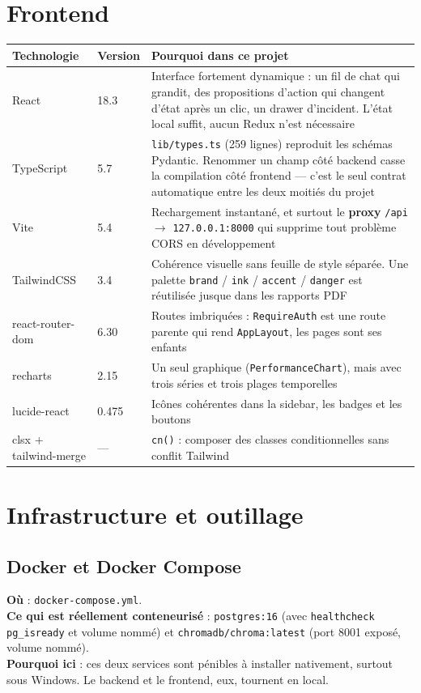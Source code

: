 \documentclass[11pt,a4paper]{report}
\newcommand{\file}[1]{\texttt{\small #1}}
\newcommand{\fn}[1]{\texttt{\small\textcolor{oasisviolet}{#1}}}
\newcommand{\cls}[1]{\texttt{\small\textcolor{oasisblue}{#1}}}
\newcommand{\route}[1]{\texttt{\small\textcolor{oasisgreen}{#1}}}
\newcommand{\arrowto}{\ensuremath{\rightarrow}}
\begin{document}
\section{Frontend}

\begin{longtable}{@{}p{3.2cm}p{2.0cm}p{9.5cm}@{}}
\toprule
\textbf{Technologie} & \textbf{Version} & \textbf{Pourquoi dans ce projet}\\
\midrule
\endhead
React & 18.3 & Interface fortement dynamique : un fil de chat qui grandit, des propositions d'action qui changent d'état après un clic, un drawer d'incident. L'état local suffit, aucun Redux n'est nécessaire\\
TypeScript & 5.7 & \file{lib/types.ts} (259 lignes) reproduit les schémas Pydantic. Renommer un champ côté backend casse la compilation côté frontend --- c'est le seul contrat automatique entre les deux moitiés du projet\\
Vite & 5.4 & Rechargement instantané, et surtout le \textbf{proxy} \route{/api} \arrowto{} \texttt{127.0.0.1:8000} qui supprime tout problème CORS en développement\\
TailwindCSS & 3.4 & Cohérence visuelle sans feuille de style séparée. Une palette \texttt{brand} / \texttt{ink} / \texttt{accent} / \texttt{danger} est réutilisée jusque dans les rapports PDF\\
react-router-dom & 6.30 & Routes imbriquées : \cls{RequireAuth} est une route parente qui rend \cls{AppLayout}, les pages sont ses enfants\\
recharts & 2.15 & Un seul graphique (\cls{PerformanceChart}), mais avec trois séries et trois plages temporelles\\
lucide-react & 0.475 & Icônes cohérentes dans la sidebar, les badges et les boutons\\
clsx + tailwind-merge & --- & \fn{cn()} : composer des classes conditionnelles sans conflit Tailwind\\
\bottomrule
\end{longtable}

\section{Infrastructure et outillage}

\subsection{Docker et Docker Compose}
\textbf{Où} : \file{docker-compose.yml}.\\
\textbf{Ce qui est réellement conteneurisé} : \texttt{postgres:16} (avec
\texttt{healthcheck} \texttt{pg\_isready} et volume nommé) et
\texttt{chromadb/chroma:latest} (port 8001 exposé, volume nommé).\\
\textbf{Pourquoi ici} : ces deux services sont pénibles à installer nativement,
surtout sous Windows. Le backend et le frontend, eux, tournent en local.
\end{document}

